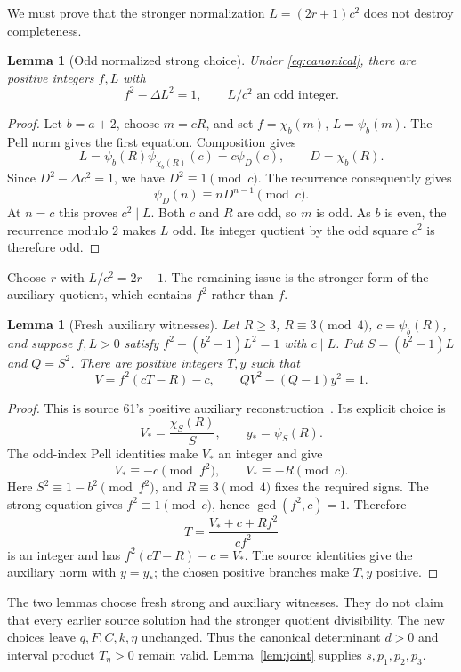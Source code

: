 \documentclass[11pt]{article}
\newtheorem{lemma}[theorem]{Lemma}
\theoremstyle{definition}
\theoremstyle{remark}
\begin{document}
We must prove that the stronger normalization \(L=(2r+1)c^2\) does not
destroy completeness.

\begin{lemma}[Odd normalized strong choice]\label{lem:normalized}
Under \eqref{eq:canonical}, there are positive integers \(f,L\) with
\[
 f^2-\Delta L^2=1,\qquad L/c^2\text{ an odd integer}.
\]
\end{lemma}
\begin{proof}
Let \(b=a+2\), choose \(m=cR\), and set
\(f=\chi_b(m)\), \(L=\psi_b(m)\).
The Pell norm gives the first equation. Composition gives
\[
 L=\psi_b(R)\psi_{\chi_b(R)}(c)=c\psi_D(c),
 \qquad D=\chi_b(R).
\]
Since \(D^2-\Delta c^2=1\), we have \(D^2\equiv1\pmod c\).
The recurrence consequently gives
\[
 \psi_D(n)\equiv nD^{n-1}\pmod c.
\]
At \(n=c\) this proves \(c^2\mid L\). Both \(c\) and \(R\) are odd, so
\(m\) is odd. As \(b\) is even, the recurrence modulo \(2\) makes \(L\)
odd. Its integer quotient by the odd square \(c^2\) is therefore odd.
\end{proof}

Choose \(r\) with \(L/c^2=2r+1\). The remaining issue is the stronger
form of the auxiliary quotient, which contains \(f^2\) rather than \(f\).

\begin{lemma}[Fresh auxiliary witnesses]\label{lem:auxcomplete}
Let \(R\ge3\), \(R\equiv3\pmod4\), \(c=\psi_b(R)\), and suppose
\(f,L>0\) satisfy \(f^2-(b^2-1)L^2=1\) with \(c\mid L\).
Put \(S=(b^2-1)L\) and \(Q=S^2\). There are positive integers \(T,y\)
such that
\[
 V=f^2(cT-R)-c,\qquad QV^2-(Q-1)y^2=1.
\]
\end{lemma}
\begin{proof}
This is source 61's positive auxiliary reconstruction~\cite{p61}.
Its explicit choice is
\[
 V_*=\frac{\chi_S(R)}{S},\qquad y_*=\psi_S(R).
\]
The odd-index Pell identities make \(V_*\) an integer and give
\[
 V_*\equiv-c\pmod{f^2},\qquad V_*\equiv-R\pmod c.
\]
Here \(S^2\equiv1-b^2\pmod{f^2}\), and
\(R\equiv3\pmod4\) fixes the required signs.
The strong equation gives \(f^2\equiv1\pmod c\), hence
\(\gcd(f^2,c)=1\). Therefore
\[
 T=\frac{V_*+c+Rf^2}{cf^2}
\]
is an integer and has \(f^2(cT-R)-c=V_*\).
The source identities give the auxiliary norm with \(y=y_*\);
the chosen positive branches make \(T,y\) positive.
\end{proof}

The two lemmas choose fresh strong and auxiliary witnesses. They do not
claim that every earlier source solution had the stronger quotient
divisibility. The new choices leave \(q,F,C,k,\eta\) unchanged. Thus the
canonical determinant \(d>0\) and interval product
\(T_\eta>0\) remain valid. Lemma~\ref{lem:joint} supplies
\(s,p_1,p_2,p_3\).
\end{document}
